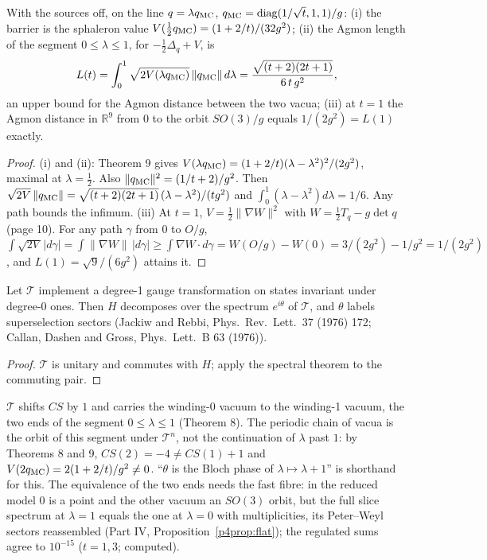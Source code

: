 \begin{proposition}\label{prop:V-agmon}
With the sources off, on the line $q=\lambda q_{\rm MC}$, $q_{\rm MC}=\operatorname{diag}(1/\sqrt t,1,1)/g$:
(i) the barrier is the sphaleron value $V(\tfrac12q_{\rm MC})=(1+2/t)/(32g^2)$; (ii) the Agmon length of the segment
$0\leq\lambda\leq1$, for $-\frac12\Delta_q+V$, is
\[
 L(t)=\int_0^1\sqrt{2V(\lambda q_{\rm MC})}\,\|q_{\rm MC}\|\,d\lambda=\frac{\sqrt{(t+2)(2t+1)}}{6\,t\,g^2},
\]
an upper bound for the Agmon distance between the two vacua; (iii) at $t=1$ the Agmon distance in $\mathbb R^9$ from
$0$ to the orbit $SO(3)/g$ equals $1/(2g^2)=L(1)$ exactly.
\end{proposition}
\begin{proof}
(i) and (ii): Theorem 9 gives $V(\lambda q_{\rm MC})=(1+2/t)(\lambda-\lambda^2)^2/(2g^2)$, maximal at
$\lambda=\frac12$. Also $\|q_{\rm MC}\|^2=(1/t+2)/g^2$. Then
$\sqrt{2V}\,\|q_{\rm MC}\|=\sqrt{(t+2)(2t+1)}\,(\lambda-\lambda^2)/(tg^2)$ and $\int_0^1(\lambda-\lambda^2)d\lambda=1/6$.
Any path bounds the infimum. (iii) At $t=1$, $V=\frac12\|\nabla W\|^2$ with $W=\frac12T_q-g\det q$ (page 10). For any
path $\gamma$ from $0$ to $O/g$, $\int\sqrt{2V}\,|d\gamma|=\int\|\nabla W\|\,|d\gamma|\geq\int\nabla W\cdot d\gamma
=W(O/g)-W(0)=3/(2g^2)-1/g^2=1/(2g^2)$, and $L(1)=\sqrt9/(6g^2)$ attains it.
\end{proof}

\begin{proposition}\label{prop:V-theta}
Let $\mathcal T$ implement a degree-1 gauge transformation on states invariant under degree-0 ones. Then $H$
decomposes over the spectrum $e^{i\theta}$ of $\mathcal T$, and $\theta$ labels superselection sectors (Jackiw and Rebbi, Phys.\ Rev.\ Lett.\ 37
(1976) 172; Callan, Dashen and Gross, Phys.\ Lett.\ B 63 (1976)).
\end{proposition}
\begin{proof}
$\mathcal T$ is unitary and commutes with $H$; apply the spectral theorem to the commuting pair.
\end{proof}

\begin{remark}
$\mathcal T$ shifts $CS$ by $1$ and carries the winding-0 vacuum to the winding-1 vacuum, the two ends of the segment
$0\leq\lambda\leq1$ (Theorem 8). The periodic chain of vacua is the orbit of this segment under $\mathcal T^n$, not the
continuation of $\lambda$ past $1$: by Theorems 8 and 9, $CS(2)=-4\neq CS(1)+1$ and
$V(2q_{\rm MC})=2(1+2/t)/g^2\neq0$. ``$\theta$ is the Bloch
phase of $\lambda\mapsto\lambda+1$'' is shorthand for this. The equivalence of the two ends needs the fast fibre: in the
reduced model $0$ is a point and the other vacuum an $SO(3)$ orbit, but the full slice spectrum at $\lambda=1$ equals
the one at $\lambda=0$ with multiplicities, its Peter--Weyl sectors reassembled (Part IV,
Proposition~\ref{p4prop:flat}); the regulated sums agree to $10^{-15}$ ($t=1,3$; computed).
\end{remark}

